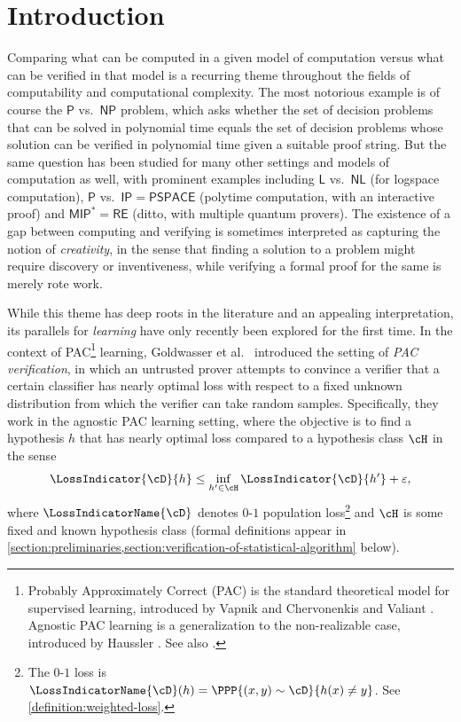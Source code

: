 \documentclass{toc}
\begin{document}
%
%
%

\section{Introduction}

Comparing what can be computed in a given model of computation versus what can be verified in that model is a recurring theme throughout the fields of computability and computational complexity. The most notorious example is of course the $\mathsf{P}$ vs.\ $\mathsf{NP}$ problem, which asks whether the set of decision problems that can be solved in polynomial time equals the set of decision problems whose solution can be verified in polynomial time given a suitable proof string. But the same question has been studied for many other settings and models of computation as well, with prominent examples including $\mathsf{L}$ vs.\ $\mathsf{NL}$ (for logspace computation), $\mathsf{P}$ vs.\ $\mathsf{IP} = \mathsf{PSPACE}$ (polytime computation, with an interactive proof) and $\mathsf{MIP}^* = \mathsf{RE}$ (ditto, with multiple quantum provers). The existence of a gap between computing and verifying is sometimes interpreted as capturing the notion of \emph{creativity}, in the sense that finding a solution to a problem might require discovery or inventiveness, while verifying a formal proof for the same is merely rote work.

While this theme has deep roots in the literature and an appealing interpretation, its parallels for \emph{learning} have only recently been explored for the first time. In the context of PAC\footnote{Probably Approximately Correct (PAC) is the standard theoretical model for supervised learning, introduced by Vapnik and Chervonenkis \cite{VapChe68} and Valiant \cite{Valiant84}. Agnostic PAC learning is a generalization to the non-realizable case, introduced by Haussler \cite{Haussler92}. See also \cite{0033642}.} learning, Goldwasser et al.\ \cite{GoldwasserRSY21} introduced the setting of \emph{PAC verification}, in which an untrusted prover attempts to convince a verifier that a certain classifier has %
%
nearly optimal %
loss with respect to a fixed unknown distribution from which the verifier can take random samples. Specifically, they work in the agnostic PAC learning setting, where the objective is to find a hypothesis $h$ that has nearly optimal loss compared to a hypothesis class $\cH$ in the sense 
\begin{equation}\label{eq:pac-learning}
	\LossIndicator{\cD}{h} \leq \inf_{h' \in \cH} \LossIndicator{\cD}{h'} + \varepsilon,
\end{equation}
where $\LossIndicatorName{\cD}$ denotes $0$-$1$ population loss\footnote{%
	The $0$-$1$ loss is $\LossIndicatorName{\cD}(h) = \PPP{(x,y) \sim \cD}{h(x) \neq y}$. See \cref{definition:weighted-loss}.%
} and $\cH$ is some fixed and known hypothesis class (formal definitions appear in \cref{section:preliminaries,section:verification-of-statistical-algorithm} below). 
\end{document}
